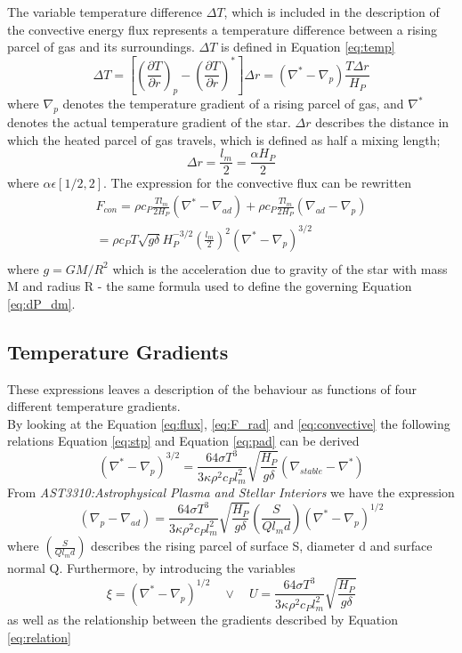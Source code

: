 \documentclass[10pt, nofootinbib, twocolumn]{revtex4-1}
\begin{document}
The variable temperature difference $\Delta T$, which is included in the description of the convective energy flux represents a temperature difference between a rising parcel of gas and its surroundings. $\Delta T$ is defined in Equation \eqref{eq:temp} \cite{ast}
\begin{equation}\label{eq:temp}
    \Delta T = [(\frac{\partial T}{\partial r})_p-(\frac{\partial T}{\partial r})^*] \Delta r =(\nabla^*-\nabla_p)\frac{T\Delta r}{H_P}
\end{equation}
where $\nabla_p$ denotes the temperature gradient of a rising parcel of gas, and $\nabla^*$ denotes the actual temperature gradient of the star. $\Delta r$ describes the distance in which the heated parcel of gas travels, which is defined as half a mixing length; 
\begin{equation}\label{eq:dr}
    \Delta r = \frac{l_m}{2}= \frac{\alpha H_P}{2}
\end{equation}
where $\alpha \epsilon [1/2,2]$. The expression for the convective flux can be rewritten \cite{ast}
\begin{equation}\label{eq:convective}
    \begin{split}
            F_{con} = \rho c_P \frac{Tl_m}{2H_P}(\nabla^*-\nabla_{ad})+\rho c_P \frac{Tl_m}{2H_P}(\nabla_{ad}-\nabla_p) \\
            = \rho c_PT\sqrt{g\delta}H_P^{-3/2}(\frac{l_m}{2})^2(\nabla^*-\nabla_p)^{3/2} \\
    \end{split}
\end{equation}
where $g=GM/R^2$ which is the acceleration due to gravity of the star with mass M and radius R - the same formula used to define the governing Equation \eqref{eq:dP_dm}.


\subsection{Temperature Gradients}
These expressions leaves a description of the behaviour as functions of four different temperature gradients. \\
By looking at the Equation \eqref{eq:flux}, \eqref{eq:F_rad} and \eqref{eq:convective} the following relations Equation \eqref{eq:stp} and Equation \eqref{eq:pad} can be derived
\begin{equation}\label{eq:stp}
    (\nabla^*-\nabla_p)^{3/2}=\frac{64\sigma T^3}{3\kappa\rho^2c_Pl_m^2}\sqrt{\frac{H_P}{g\delta}}(\nabla_{stable}-\nabla^*)
\end{equation}
From \textit{AST3310:Astrophysical Plasma and Stellar Interiors} we have the expression
\begin{equation}\label{eq:pad}
    (\nabla_p-\nabla_{ad})=\frac{64\sigma T^3}{3\kappa\rho^2c_Pl_m^2}\sqrt{\frac{H_P}{g\delta}}(\frac{S}{Ql_md})(\nabla^*-\nabla_p)^{1/2}
\end{equation}
where $(\frac{S}{Ql_md})$ describes the rising parcel of surface S, diameter d and surface normal Q. Furthermore, by introducing the variables $$ \xi =(\nabla^*-\nabla_p)^{1/2} \quad \vee \quad U=\frac{64\sigma T^3}{3\kappa\rho^2c_Pl_m^2}\sqrt{\frac{H_P}{g\delta}}$$ 
as well as the relationship between the gradients described by Equation \eqref{eq:relation} \cite[p.~64]{ast}
\end{document}
